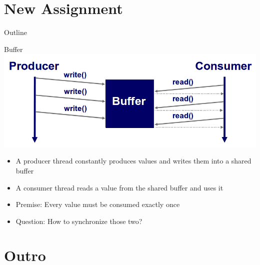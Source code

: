 \section{New Assignment}

\begin{frame}{Outline}
  \tableofcontents[current]
\end{frame}

\begin{frame}{Buffer}
  \includegraphics[width=\textwidth]{figures/buffer}


  \begin{itemize}
  \item A producer thread constantly produces values and writes them
    into a shared buffer
  \item A consumer thread reads a value from the shared buffer and
    uses it
  \item Premise: Every value must be consumed exactly once
  \item Question: How to synchronize those two?
  \end{itemize}
\end{frame}


\section*{Outro}

